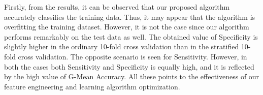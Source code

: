 \documentclass[12pt,a4paper]{article}
\begin{document}
\begin{table}[]
\begin{center}
\small
\caption{\label{tab:res}Experimental Results. Here we have shown both the results of the 10-Fold Cross Validation and Stratified 10-Fold Cross Validation tests.}
\end{center}
\end{table}



Firstly, from the results, it can be observed that our proposed algorithm accurately classifies the training data. Thus, it may appear that the algorithm is overfitting the training dataset. However, it is not the case since our algorithm performs remarkably on the test data as well. The obtained value of Specificity is slightly higher in the ordinary 10-fold cross validation than in the stratified 10-fold cross validation. The opposite scenario is seen for Sensitivity. However, in both the cases both Sensitivity and Specificity is equally high, and it is reflected by the high value of G-Mean Accuracy. All these points to the effectiveness of our feature engineering and learning algorithm optimization.
\end{document}
